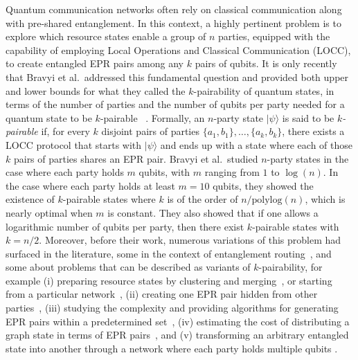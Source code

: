 \documentclass[10pt,a4paper]{article}
\newcommand{\ket}[1]{{\ensuremath{\lvert#1\rangle}}}
\begin{document}
Quantum communication networks often rely on classical communication along with pre-shared entanglement. 
In this context, a highly pertinent problem is to explore which resource states enable a group of $n$ parties, equipped with the capability of employing Local  Operations and Classical Communication (LOCC), to create entangled EPR pairs among any $k$ pairs of qubits. It is only recently that Bravyi et al.~addressed this fundamental question and provided both upper and lower bounds for what they called the $k$-pairability of quantum states, in terms of the number of parties and the number of qubits per party needed for a quantum state to be $k$-pairable ~\cite{bravyi2022generating}. Formally, an $n$-party state $\ket \psi$ is said to be \textit{$k$-pairable} if, for every $k$ disjoint pairs of parties  $\{a_1, b_1\},\ldots,\{a_k, b_k\}$, there exists a LOCC protocol that starts with $\ket \psi$ and ends up with a state where each of those $k$ pairs of parties shares an EPR pair. Bravyi et al.~studied $n$-party states in the case where each party holds  $m$ qubits, with $m$ ranging from $1$ to $\log(n)$. In the case where each party holds at least $m = 10$ qubits, they showed the existence of $k$-pairable states where $k$ is of the order of $n/ \text{polylog}(n)$, which is nearly optimal when $m$ is constant. They also showed that if one allows a logarithmic number of qubits per party, then there exist $k$-pairable states with $k = n/ 2$. Moreover, before their work, numerous variations of this problem had surfaced in the literature, some in the context of entanglement routing~\cite{schoute2016shortcuts,hahn2019quantum,pant2019routing}, and some about problems that can be described as variants of $k$-pairability, for example (i) preparing resource states by clustering and merging~\cite{Miguel_Ramiro_2023}, or  starting from a particular network~\cite{DSL:multipoint,Contreras_Tejada_2022}, (ii) creating one EPR pair hidden from other parties~\cite{illianoetal}, (iii) studying the complexity and providing algorithms for generating EPR pairs within a predetermined set~\cite{dahlberg2020transforming,DHW:howtotransform}, (iv) estimating the cost of distributing a graph state in terms of EPR pairs~\cite{meignant2019distributing,fischer2021distributing}, and (v) transforming an arbitrary entangled state into another through a network where each party holds multiple qubits \cite{christandl2023resource}. 
\end{document}
